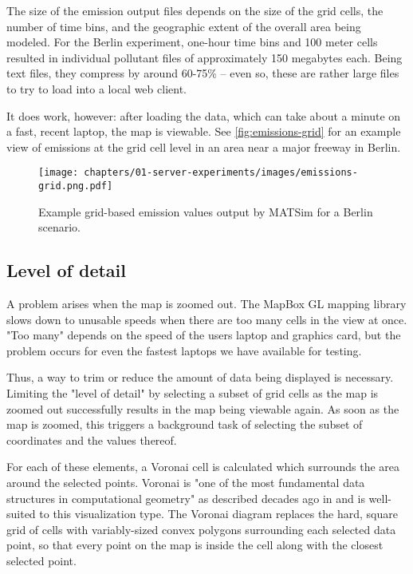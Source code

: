 The size of the emission output files depends on the size of the grid cells, the number of time bins, and the geographic extent of the overall area being modeled. For the Berlin experiment, one-hour time bins and 100 meter cells resulted in individual pollutant files of approximately 150 megabytes each. Being text files, they compress by around 60-75\% -- even so, these are rather large files to try to load into a local web client.

It does work, however: after loading the data, which can take about a minute on a fast, recent laptop, the map is viewable. See \autoref{fig:emissions-grid} for an example view of emissions at the grid cell level in an area near a major freeway in Berlin.

\begin{figure}[!ht]
  \texttt{[image: chapters/01-server-experiments/images/emissions-grid.png.pdf]}
  \caption{Example grid-based emission values output by MATSim for a Berlin scenario.}
  \label{fig:emissions-grid}
\end{figure}

\hypertarget{server-experiments-emissions-lod}{%
\subsection{Level of detail}
\label{server-experiments-emissions-lod}}

A problem arises when the map is zoomed out. The MapBox GL mapping library slows down to unusable speeds when there are too many cells in the view at once. "Too many" depends on the speed of the users laptop and graphics card, but the problem occurs for even the fastest laptops we have available for testing.

Thus, a way to trim or reduce the amount of data being displayed is necessary. Limiting the "level of detail" by selecting a subset of grid cells as the map is zoomed out successfully results in the map being viewable again. As soon as the map is zoomed, this triggers a background task of selecting the subset of coordinates and the values thereof.

For each of these elements, a Voronai cell is calculated which surrounds the area around the selected points. Voronai is "one of the most fundamental data structures in computational geometry" as described decades ago in \cite{aurenhammer1991voronoi} and is well-suited to this visualization type. The Voronai diagram replaces the hard, square grid of cells with variably-sized convex polygons surrounding each selected data point, so that every point on the map is inside the cell along with the closest selected point.

